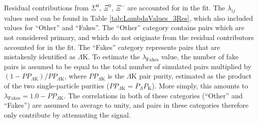 \documentclass[ALICE,manyauthors]{cernphprep}
\newcommand{\LamK}{$\Lambda$K\xspace}
\begin{document}
Residual contributions from $\Sigma^{0}$, $\Xi^{0}$, $\Xi^{-}$ are accounted for in the fit.
The $\lambda_{ij}$ values used can be found in Table \ref{tab:LambdaValues_3Res}, which also included values for ``Other'' and ``Fakes''.  
The ``Other'' category contains pairs which are not considered primary, and which do not originate from the residual contributors accounted for in the fit.  
The ``Fakes'' category represents pairs that are mistakenly identified as \LamK.  
To estimate the $\lambda_{\mathrm{Fakes}}$ value, the number of fake pairs is assumed to be equal to the total number of simulated pairs multiplied by $(1-PP_{\Lambda\mathrm{K}})/PP_{\Lambda\mathrm{K}}$, where $PP_{\Lambda\mathrm{K}}$ is the \LamK pair purity, estimated as the product of the two single-particle purities ($PP_{\Lambda\mathrm{K}} = P_{\Lambda}P_{\mathrm{K}}$).
More simply, this amounts to $\lambda_{\mathrm{Fakes}} = 1.0-PP_{\Lambda\mathrm{K}}$.
The correlations in both of these categories (``Other'' and ``Fakes'') are assumed to average to unity, and pairs in these categories therefore only contribute by attenuating the signal. 
\end{document}
